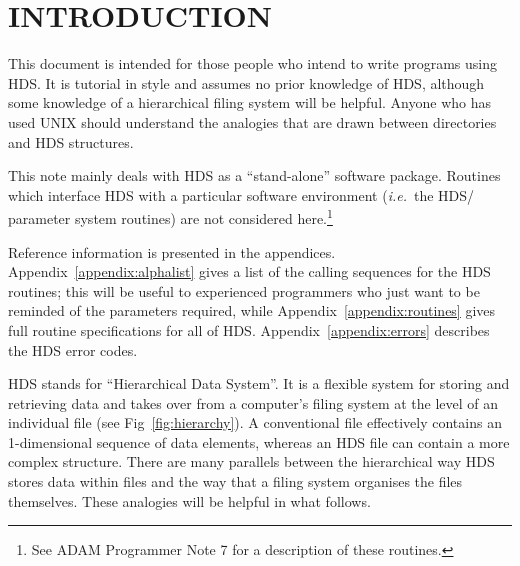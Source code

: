 \documentclass[twoside,11pt]{starlink}
\providecommand{\qt}[1]{``#1''}
\providecommand{\st}[1]{{\emph{#1}}}
\begin{document}
\scfrontmatter

\section {INTRODUCTION}

This document is intended for those people who intend to write
programs using HDS. It is tutorial in style and assumes no prior
knowledge of HDS, although some knowledge of a hierarchical filing
system will be helpful. Anyone who has used UNIX should understand the
analogies that are drawn between directories and HDS structures.

This note mainly deals with HDS as a \qt{stand-alone} software
package. Routines which interface HDS with a particular software
environment (\st{i.e.}\ the HDS/ parameter system
routines) are not considered here.\footnote{See ADAM Programmer Note 7
for a description of these routines.}

Reference information is presented in the appendices.
Appendix~\ref{appendix:alphalist} gives a list of the calling
sequences for the HDS routines; this will be useful to experienced
programmers who just want to be reminded of the parameters required,
while Appendix~\ref{appendix:routines} gives full routine
specifications for all of HDS.  Appendix~\ref{appendix:errors}
describes the HDS error codes.

HDS stands for \qt{Hierarchical Data System}. It is a flexible system
for storing and retrieving data and takes over from a computer's
filing system at the level of an individual file (see
Fig~\ref{fig:hierarchy}). A conventional file effectively contains an
1-dimensional sequence of data elements, whereas an HDS file can
contain a more complex structure. There are many parallels between the
hierarchical way HDS stores data within files and the way that a
filing system organises the files themselves. These analogies will be
helpful in what follows.
\end{document}
